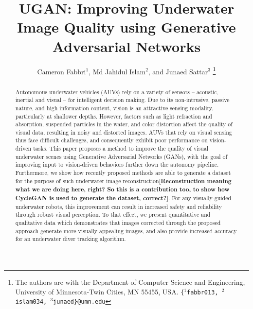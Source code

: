 \documentclass[letterpaper, 10pt, conference]{ieeeconf}
\title{UGAN: Improving Underwater Image Quality using Generative Adversarial Networks}
\author{Cameron Fabbri$^{1}$, Md Jahidul Islam$^{2}$, and Junaed Sattar$^{3}$
\thanks{				
  The authors are with the Department of Computer Science and Engineering, University of Minnesota-Twin  Cities, MN 55455, USA. \newline
 {\tt\small\{$^{1}$fabbr013, $^{2}$islam034, $^{3}$junaed\}@umn.edu}
}
}
\newcommand{\marginlabel}[1]{\mbox{}\marginpar[\raggedleft\hspace{0pt}{#1}]{
\raggedright\hspace{0pt}{#1}}}
\newcommand{\starnote}[1]{\marginlabel{$\bigstar$}\textbf{[#1]}}
\begin{document}
\maketitle

\begin{abstract}
Autonomous underwater vehicles (AUVs) rely on a variety of sensors -- acoustic, inertial and visual -- for intelligent decision making. Due
to its non-intrusive, passive nature, and high information content, vision is an attractive sensing modality, particularly at shallower
depths. However, factors such as light refraction and absorption, suspended particles in the water, and color distortion affect the quality
of visual data, resulting in noisy and distorted images. AUVs that rely on visual sensing thus face difficult challenges, and consequently
exhibit poor performance on vision-driven tasks. This paper proposes a method to improve the quality of visual underwater scenes using
Generative Adversarial Networks (GANs), with the goal of improving input to vision-driven behaviors further down the autonomy
pipeline. Furthermore, we show how recently proposed methods are able to generate a dataset for the purpose of such underwater image
reconstruction\starnote{Reconstruction meaning what we are doing here, right? So this is a contribution too, to show how CycleGAN is used to
generate the dataset, correct?}. For any visually-guided underwater robots, this improvement can result in increased safety and reliability
through robust visual perception. To that effect, we present quantitative and qualitative data which demonstrates that images corrected
through the proposed approach generate more visually appealing images, and also provide increased accuracy for an underwater diver tracking
algorithm.
\end{abstract}

\end{document}
